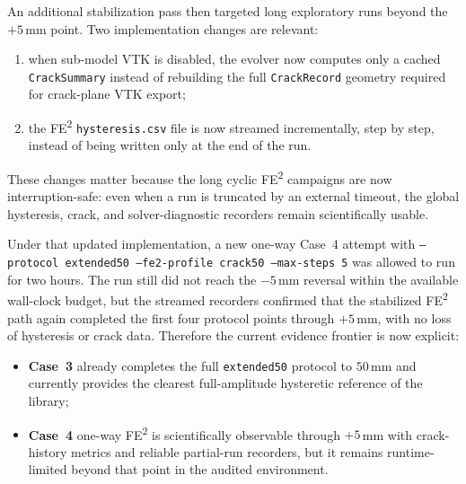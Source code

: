 An additional stabilization pass then targeted long exploratory runs beyond the
\(+5\)\,mm point.  Two implementation changes are relevant:
\begin{enumerate}
  \item when sub-model VTK is disabled, the evolver now computes only a cached
    \texttt{CrackSummary} instead of rebuilding the full \texttt{CrackRecord}
    geometry required for crack-plane VTK export;
  \item the FE\textsuperscript{2} \texttt{hysteresis.csv} file is now streamed
    incrementally, step by step, instead of being written only at the end of
    the run.
\end{enumerate}
These changes matter because the long cyclic FE\textsuperscript{2} campaigns
are now interruption-safe: even when a run is truncated by an external timeout,
the global hysteresis, crack, and solver-diagnostic recorders remain
scientifically usable.

Under that updated implementation, a new one-way Case~4 attempt with
\texttt{--protocol extended50 --fe2-profile crack50 --max-steps 5} was allowed
to run for two hours.  The run still did not reach the \(-5\)\,mm reversal
within the available wall-clock budget, but the streamed recorders confirmed
that the stabilized FE\textsuperscript{2} path again completed the first four
protocol points through \(+5\)\,mm, with no loss of hysteresis or crack data.
Therefore the current evidence frontier is now explicit:
\begin{itemize}
  \item \textbf{Case~3} already completes the full \texttt{extended50} protocol
    to \(50\)\,mm and currently provides the clearest full-amplitude
    hysteretic reference of the library;
  \item \textbf{Case~4} one-way FE\textsuperscript{2} is scientifically
    observable through \(+5\)\,mm with crack-history metrics and reliable
    partial-run recorders, but it remains runtime-limited beyond that point in
    the audited environment.
\end{itemize}

